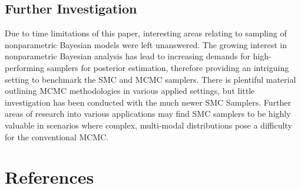 \documentclass[12pt]{elsarticle}
\begin{document}
\subsection*{Further Investigation}
Due to time limitations of this paper, interesting areas relating to sampling of nonparametric Bayesian models were left unanswered. The growing interest in nonparametric Bayesian analysis has lead to increasing demands for high-performing samplers for posterior estimation, therefore providing an intriguing setting to benchmark the SMC and MCMC samplers. There is plentiful material outlining MCMC methodologies in various applied settings, but little investigation has been conducted with the much newer SMC Samplers. Further areas of research into various applications may find SMC samplers to be highly valuable in scenarios where complex, multi-modal distributions pose a difficulty for the conventional MCMC.


\section*{References}
%
\nocite{Bishop2007}
\nocite{Murphy2012}
\nocite{Lindsten2014}
\nocite{Andrieu2003}


\end{document}
